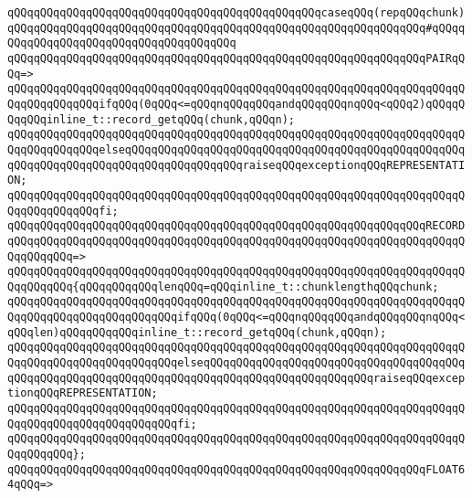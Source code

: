 \verb|qQQqqQQqqQQqqQQqqQQqqQQqqQQqqQQqqQQqqQQqqQQqqQQqcaseqQQq(repqQQqchunk)|\newline
\verb|qQQqqQQqqQQqqQQqqQQqqQQqqQQqqQQqqQQqqQQqqQQqqQQqqQQqqQQqqQQqqQQq#qQQqqQQqqQQqqQQqqQQqqQQqqQQqqQQqqQQqqQQq|\newline
\verb|qQQqqQQqqQQqqQQqqQQqqQQqqQQqqQQqqQQqqQQqqQQqqQQqqQQqqQQqqQQqqQQqPAIRqQQq=>|\newline
\verb|qQQqqQQqqQQqqQQqqQQqqQQqqQQqqQQqqQQqqQQqqQQqqQQqqQQqqQQqqQQqqQQqqQQqqQQqqQQqqQQqqQQqifqQQq(0qQQq<=qQQqnqQQqqQQqandqQQqqQQqnqQQq<qQQq2)qQQqqQQqqQQqinline_t::record_getqQQq(chunk,qQQqn);|\newline
\verb|qQQqqQQqqQQqqQQqqQQqqQQqqQQqqQQqqQQqqQQqqQQqqQQqqQQqqQQqqQQqqQQqqQQqqQQqqQQqqQQqqQQqelseqQQqqQQqqQQqqQQqqQQqqQQqqQQqqQQqqQQqqQQqqQQqqQQqqQQqqQQqqQQqqQQqqQQqqQQqqQQqqQQqqQQqqQQqraiseqQQqexceptionqQQqREPRESENTATION;|\newline
\verb|qQQqqQQqqQQqqQQqqQQqqQQqqQQqqQQqqQQqqQQqqQQqqQQqqQQqqQQqqQQqqQQqqQQqqQQqqQQqqQQqqQQqfi;|\newline
\newline
\verb|qQQqqQQqqQQqqQQqqQQqqQQqqQQqqQQqqQQqqQQqqQQqqQQqqQQqqQQqqQQqqQQqRECORD|\newline
\verb|qQQqqQQqqQQqqQQqqQQqqQQqqQQqqQQqqQQqqQQqqQQqqQQqqQQqqQQqqQQqqQQqqQQqqQQqqQQqqQQq=>|\newline
\verb|qQQqqQQqqQQqqQQqqQQqqQQqqQQqqQQqqQQqqQQqqQQqqQQqqQQqqQQqqQQqqQQqqQQqqQQqqQQqqQQq{qQQqqQQqqQQqlenqQQq=qQQqinline_t::chunklengthqQQqchunk;|\newline
\newline
\verb|qQQqqQQqqQQqqQQqqQQqqQQqqQQqqQQqqQQqqQQqqQQqqQQqqQQqqQQqqQQqqQQqqQQqqQQqqQQqqQQqqQQqqQQqqQQqqQQqifqQQq(0qQQq<=qQQqnqQQqqQQqandqQQqqQQqnqQQq<qQQqlen)qQQqqQQqqQQqinline_t::record_getqQQq(chunk,qQQqn);|\newline
\verb|qQQqqQQqqQQqqQQqqQQqqQQqqQQqqQQqqQQqqQQqqQQqqQQqqQQqqQQqqQQqqQQqqQQqqQQqqQQqqQQqqQQqqQQqqQQqqQQqelseqQQqqQQqqQQqqQQqqQQqqQQqqQQqqQQqqQQqqQQqqQQqqQQqqQQqqQQqqQQqqQQqqQQqqQQqqQQqqQQqqQQqqQQqqQQqqQQqraiseqQQqexceptionqQQqREPRESENTATION;|\newline
\verb|qQQqqQQqqQQqqQQqqQQqqQQqqQQqqQQqqQQqqQQqqQQqqQQqqQQqqQQqqQQqqQQqqQQqqQQqqQQqqQQqqQQqqQQqqQQqqQQqfi;|\newline
\verb|qQQqqQQqqQQqqQQqqQQqqQQqqQQqqQQqqQQqqQQqqQQqqQQqqQQqqQQqqQQqqQQqqQQqqQQqqQQqqQQq};|\newline
\newline
\verb|qQQqqQQqqQQqqQQqqQQqqQQqqQQqqQQqqQQqqQQqqQQqqQQqqQQqqQQqqQQqqQQqFLOAT64qQQq=>|\newline
